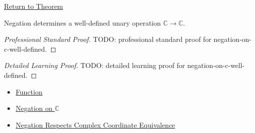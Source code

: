 \newpage
{}
\label{prf:negation-on-c-well-defined}

\begin{remark*}[Return]
\hyperref[thm:negation-on-c-well-defined]{Return to Theorem}
\end{remark*}

\begin{theorem*}
Negation determines a well-defined unary operation $\mathbb{C}\to\mathbb{C}$.
\end{theorem*}

\begin{proof}[Professional Standard Proof]
\LRAProofBodyStart
TODO: professional standard proof for negation-on-c-well-defined.
\end{proof}

\begin{proof}[Detailed Learning Proof]
\LRAProofBodyStart
TODO: detailed learning proof for negation-on-c-well-defined.
\end{proof}

\begin{remark*}
\end{remark*}

\begin{dependencies}
\begin{itemize}
  \item \hyperref[def:function]{Function}
  \item \hyperref[def:negation-on-c-classes]{Negation on $\mathbb{C}$}
  \item \hyperref[lem:negation-on-c-respects-equivalence]{Negation Respects Complex Coordinate Equivalence}
\end{itemize}
\end{dependencies}

\clearpage
